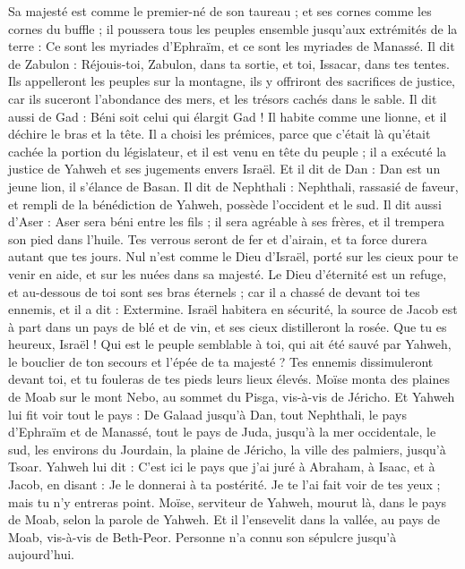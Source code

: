\begin{multicols}{2}
Sa majesté est comme le premier-né de son taureau ; et ses cornes comme les cornes du buffle ; il poussera tous les peuples ensemble jusqu’aux extrémités de la terre : Ce sont les myriades d'Ephraïm, et ce sont les myriades de Manassé.
Il dit de Zabulon : Réjouis-toi, Zabulon, dans ta sortie, et toi, Issacar, dans tes tentes.
Ils appelleront les peuples sur la montagne, ils y offriront des sacrifices de justice, car ils suceront l'abondance des mers, et les trésors cachés dans le sable.
Il dit aussi de Gad : Béni soit celui qui élargit Gad ! Il habite comme une lionne, et il déchire le bras et la tête.
Il a choisi les prémices, parce que c'était là qu'était cachée la portion du législateur, et il est venu en tête du peuple ; il a exécuté la justice de Yahweh et ses jugements envers Israël.
Et il dit de Dan : Dan est un jeune lion, il s’élance de Basan.
Il dit de Nephthali : Nephthali, rassasié de faveur, et rempli de la bénédiction de Yahweh, possède l'occident et le sud.
Il dit aussi d'Aser : Aser sera béni entre les fils ; il sera agréable à ses frères, et il trempera son pied dans l'huile.
Tes verrous seront de fer et d'airain, et ta force durera autant que tes jours.
Nul n’est comme le Dieu d’Israël, porté sur les cieux pour te venir en aide, et sur les nuées dans sa majesté.
Le Dieu d’éternité est un refuge, et au-dessous de toi sont ses bras éternels ; car il a chassé de devant toi tes ennemis, et il a dit : Extermine.
Israël habitera en sécurité, la source de Jacob est à part dans un pays de blé et de vin, et ses cieux distilleront la rosée.
Que tu es heureux, Israël ! Qui est le peuple semblable à toi, qui ait été sauvé par Yahweh, le bouclier de ton secours et l'épée de ta majesté ? Tes ennemis dissimuleront devant toi, et tu fouleras de tes pieds leurs lieux élevés.
\VerseOne{}Moïse monta des plaines de Moab sur le mont Nebo, au sommet du Pisga, vis-à-vis de Jéricho. Et Yahweh lui fit voir tout le pays : De Galaad jusqu’à Dan,
tout Nephthali, le pays d'Ephraïm et de Manassé, tout le pays de Juda, jusqu'à la mer occidentale,
le sud, les environs du Jourdain, la plaine de Jéricho, la ville des palmiers, jusqu'à Tsoar.
Yahweh lui dit : C'est ici le pays que j'ai juré à Abraham, à Isaac, et à Jacob, en disant : Je le donnerai à ta postérité. Je te l'ai fait voir de tes yeux ; mais tu n'y entreras point.
Moïse, serviteur de Yahweh, mourut là, dans le pays de Moab, selon la parole de Yahweh.
Et il l'ensevelit dans la vallée, au pays de Moab, vis-à-vis de Beth-Peor. Personne n'a connu son sépulcre jusqu'à aujourd'hui.

\end{multicols}
